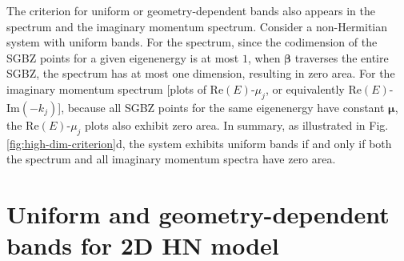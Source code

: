 \documentclass[pdflatex,sn-nature, iicol]{sn-jnl}%
\theoremstyle{thmstyleone}%
\theoremstyle{thmstyletwo}%
\theoremstyle{thmstylethree}%
\begin{document}
The criterion for uniform or geometry-dependent bands also appears
in the spectrum and the imaginary momentum spectrum. Consider a non-Hermitian
system with uniform bands. For the spectrum, since the codimension
of the SGBZ points for a given eigenenergy is at most $1$, when $\boldsymbol{\beta}$
traverses the entire SGBZ, the spectrum has at most one dimension,
resulting in zero area. For the imaginary momentum spectrum {[}plots
of $\text{Re}(E)$-$\mu_{j}$, or equivalently $\text{Re}(E)$-$\text{Im}(-k_{j})${]},
because all SGBZ points for the same eigenenergy have constant $\boldsymbol{\mu}$,
the $\text{Re}(E)$-$\mu_{j}$ plots also exhibit zero area. In summary,
as illustrated in Fig. \ref{fig:high-dim-criterion}d, the system
exhibits uniform bands if and only if both the spectrum and all imaginary
momentum spectra have zero area.

\pagebreak
\section{Uniform and geometry-dependent bands for 2D HN model}
\label{sec:uniform-band-HN-model}
\end{document}
